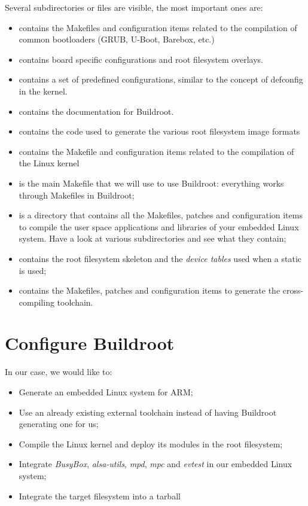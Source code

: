 Several subdirectories or files are visible, the most important ones
are:

\begin{itemize}
\item {} contains the Makefiles and configuration items
  related to the compilation of common bootloaders (GRUB, U-Boot,
  Barebox, etc.)
\item {} contains board specific configurations and
  root filesystem overlays.
\item {} contains a set of predefined configurations,
  similar to the concept of defconfig in the kernel.
\item {} contains the documentation for Buildroot.
\item {} contains the code used to generate the various root
  filesystem image formats
\item {} contains the Makefile and configuration items
  related to the compilation of the Linux kernel
\item {} is the main Makefile that we will use to use
  Buildroot: everything works through Makefiles in Buildroot;
\item {} is a directory that contains all the Makefiles,
  patches and configuration items to compile the user space
  applications and libraries of your embedded Linux system. Have a
  look at various subdirectories and see what they contain;
\item {} contains the root filesystem skeleton and the {\em
    device tables} used when a static  is used;
\item {} contains the Makefiles, patches and
  configuration items to generate the cross-compiling toolchain.
\end{itemize}


\section{Configure Buildroot}

In our case, we would like to:

\begin{itemize}
\item Generate an embedded Linux system for ARM;
\item Use an already existing external toolchain instead of having
  Buildroot generating one for us;
\item Compile the Linux kernel and deploy its modules in the root
  filesystem;
\item Integrate {\em BusyBox}, {\em alsa-utils},
  {\em mpd}, {\em mpc} and {\em evtest} in our embedded Linux system;
\item Integrate the target filesystem into a tarball
\end{itemize}

